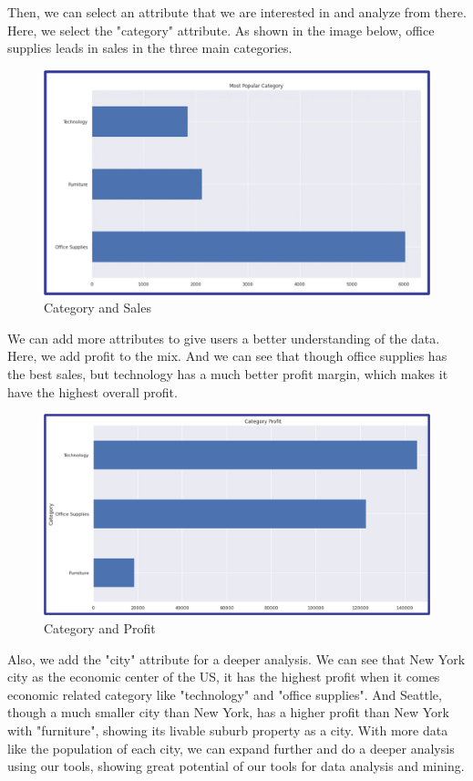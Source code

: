 Then, we can select an attribute that we are interested in and analyze from there. Here, we select the "category" attribute. As shown in the image below, office supplies leads in sales in the three main categories.

\begin{figure}[H]
    \centering
    \includegraphics[width=\columnwidth]{images/cata1.png}
    \caption[Short text]{Category and Sales}
    \label{fig:Category&Sales}
\end{figure}

We can add more attributes to give users a better understanding of the data. Here, we add profit to the mix. And we can see that though office supplies has the best sales, but technology has a much better profit margin, which makes it have the highest overall profit.

\begin{figure}[H]
    \centering
    \includegraphics[width=\columnwidth]{images/cata2.png}
    \caption[Short text]{Category and Profit}
    \label{fig:Category&Profit}
\end{figure}
Also, we add the "city" attribute for a deeper analysis. We can see that New York city as the economic center of the US, it has the highest profit when it comes economic related category like "technology" and "office supplies". And Seattle, though a much smaller city than New York, has a higher profit than New York with "furniture", showing its livable suburb property as a city.
With more data like the population of each city, we can expand further and do a deeper analysis using our tools, showing great potential of our tools for data analysis and mining.


